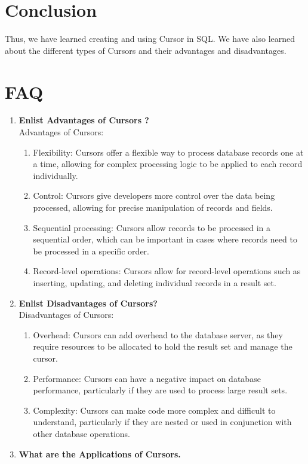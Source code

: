 \documentclass[11pt]{article}
\begin{document}
\section{Conclusion}
Thus, we have learned creating and using Cursor in SQL. We have also learned about the different types of Cursors and their advantages and disadvantages.

\clearpage

\section{FAQ}
\begin{enumerate}


    \item \textbf{Enlist Advantages of Cursors ?}\\
          Advantages of Cursors:
          \begin{enumerate}
              \item Flexibility: Cursors offer a flexible way to process database records one at a time, allowing for complex processing logic to be applied to each record individually.
              \item Control: Cursors give developers more control over the data being processed, allowing for precise manipulation of records and fields.
              \item Sequential processing: Cursors allow records to be processed in a sequential order, which can be important in cases where records need to be processed in a specific order.
              \item Record-level operations: Cursors allow for record-level operations such as inserting, updating, and deleting individual records in a result set.
          \end{enumerate}

    \item \textbf{Enlist Disadvantages of Cursors?}\\

          Disadvantages of Cursors:
          \begin{enumerate}
              \item Overhead: Cursors can add overhead to the database server, as they require resources to be allocated to hold the result set and manage the cursor.
              \item Performance: Cursors can have a negative impact on database performance, particularly if they are used to process large result sets.
              \item Complexity: Cursors can make code more complex and difficult to understand, particularly if they are nested or used in conjunction with other database operations.
          \end{enumerate}
    \item \textbf{What are the Applications of Cursors.}\\


\end{enumerate}
\end{document}
